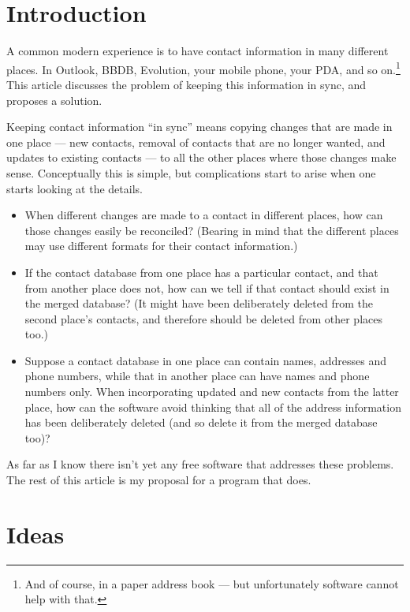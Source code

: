 \documentclass{article}
\begin{document}
\section{Introduction}

A common modern experience is to have contact information in many
different places.  In Outlook, BBDB, Evolution, your mobile phone,
your PDA, and so on.\footnote{And of course, in a paper address book
  --- but unfortunately software cannot help with that.}  This article
discusses the problem of keeping this information in sync, and
proposes a solution.

Keeping contact information ``in sync'' means copying changes that are
made in one place --- new contacts, removal of contacts that are no
longer wanted, and updates to existing contacts --- to all the other
places where those changes make sense.  Conceptually this is simple,
but complications start to arise when one starts looking at the
details.

\begin{itemize}

\item When different changes are made to a contact in different
  places, how can those changes easily be reconciled?  (Bearing in
  mind that the different places may use different formats for their
  contact information.)

\item If the contact database from one place has a particular contact,
  and that from another place does not, how can we tell if that
  contact should exist in the merged database?  (It might have been
  deliberately deleted from the second place's contacts, and therefore
  should be deleted from other places too.)

\item Suppose a contact database in one place can contain names,
  addresses and phone numbers, while that in another place can have
  names and phone numbers only.  When incorporating updated and new
  contacts from the latter place, how can the software avoid thinking
  that all of the address information has been deliberately deleted
  (and so delete it from the merged database too)?

\end{itemize}

As far as I know there isn't yet any free software that addresses
these problems.  The rest of this article is my proposal for a program
that does.

\section{Ideas}
\end{document}
